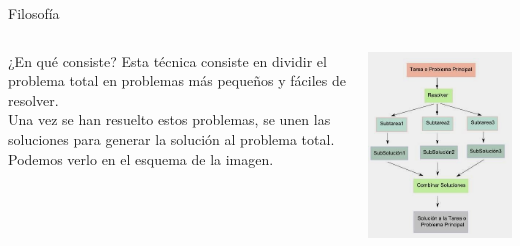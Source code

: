 \documentclass[compress]{beamer}
\begin{document}
\begin{frame}{Filosofía}
	\begin{columns}
		\begin{column}{4.3cm}
			\begin{block}{¿En qué consiste?}
			Esta técnica consiste en dividir el problema total en problemas más pequeños y fáciles de resolver.\\
			\vspace{0.20in}
			Una vez se han resuelto estos problemas, se unen las soluciones para generar la solución al problema total. Podemos verlo en el esquema de la imagen.
			\end{block}
		\end{column}
		\begin{column}{6cm}
			\begin{alertblock}{}
			\hspace*{+0.5cm}\includegraphics[scale=0.36]{images/metodo_divide_y_venceras.JPG}
			\end{alertblock}
		\end{column}
	\end{columns}
\end{frame}
\end{document}
